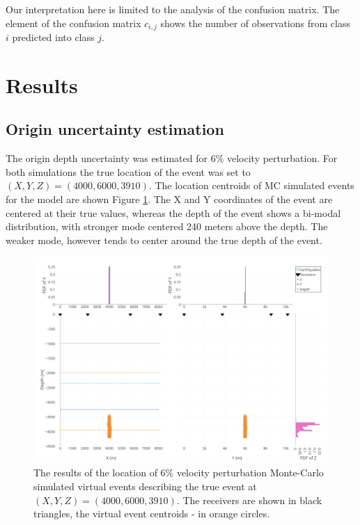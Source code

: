 \documentclass[letterpaper,11pt]{article}
\begin{document}
Our interpretation here is limited to the analysis of the confusion matrix. The element of the confusion matrix $c_{i,j}$ shows the number of observations from class $i$ predicted into class $j$.


\section*{Results}
\subsection*{Origin uncertainty estimation}
The origin depth uncertainty was estimated for 6\% velocity perturbation. For both simulations the true location of the event was set to $(X,Y,Z) = (4000,6000,3910)$. The location centroids of MC simulated events for the model are shown Figure \ref{fig:sigma6}. The X and Y coordinates of the event are centered at their true values, whereas the depth of the event shows a bi-modal distribution, with stronger mode centered 240 meters above the depth. The weaker mode, however tends to center around the true depth of the event.

\begin{figure}[htb]
\begin{center}
\includegraphics[width=0.6\linewidth,angle=0]{./AntonBiryukov_bibtex/Figure1_6pct.png}
\end{center}
\vspace{-4mm}
\caption{The results of the location of 6\% velocity perturbation Monte-Carlo simulated virtual events describing the true event at $(X,Y,Z) = (4000,6000,3910)$. The receivers are shown in black triangles, the virtual event centroids - in orange circles.}
\label{fig:sigma6}
\end{figure}
\end{document}
